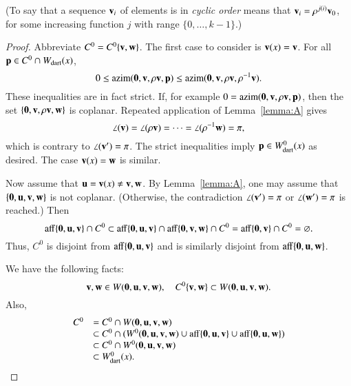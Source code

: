 (To say that a sequence $\v_i$ of elements is in {\it cyclic order} means that
$\v_i = \rho^{j (i)}\v_0$, for some increasing function $j$ with range $\{0,\ldots,k-1\}$.)

\begin{proof}  Abbreviate $C^0 = C^0\{\v,\w\}$.  The first case to consider is $\v(x)=\v$.  For all $\p\in C^0\cap \bWdart(x)$, 
$$
0 \le \op{azim}(\orz,\v,\rho \v,\p) \le \op{azim}(\orz,\v,\rho \v,\rho^{-1} \v).
$$  
These inequalities are in fact strict.  If, for example $0 = \op{azim}(\orz,\v,\rho \v,\p)$, then
the set $\{\orz,\v,\rho \v,\w\}$ is coplanar.  Repeated application of Lemma~\ref{lemma:A} gives
$$
\angle(\v) = \angle(\rho \v) = \cdots = \angle(\rho^{-1} \w) = \pi,
$$
which is contrary to $\angle(\v') = \pi$.  
The strict inequalities imply $\p\in \Wdart(x)$ as desired.  The case $\v(x)=\w$ is similar.

Now assume that $\u=\v(x)\ne \v,\w$.  
By Lemma~\ref{lemma:A},  one may assume that $\{\orz,\u,\v,\w\}$ is not coplanar. 
(Otherwise, the contradiction $\angle(\v')=\pi$ or $\angle(\w')=\pi$ is reached.) Then
$$
\op{aff}\{\orz,\u,\v\}\cap C^0 \subset \op{aff}\{\orz,\u,\v\}\cap \op{aff}\{\orz,\v,\w\} \cap C^0 = \op{aff}\{\orz,\v\} \cap C^0 = \emptyset.
$$
Thus, $C^0$ is disjoint from $\op{aff}\{\orz,\u,\v\}$ and is similarly disjoint from $\op{aff}\{\orz,\u,\w\}$.  

We have the following facts:
$$
\v,\w\in W(\orz,\u,\v,\w),\quad C^0\{\v,\w\} \subset W(\orz,\u,\v,\w).
$$
Also,
$$
\begin{array}{rll}
C^0 &= C^0\cap W(\orz,\u,\v,\w) \\
     &\subset C^0 \cap (W^0(\orz,\u,\v,\w) \cup \op{aff}\{\orz,\u,\v\} \cup \op{aff}\{\orz,\u,\w\})\\
     &\subset C^0 \cap W^0(\orz,\u,\v,\w)\\
     &\subset \Wdart(x).
\end{array}
$$
\end{proof}


